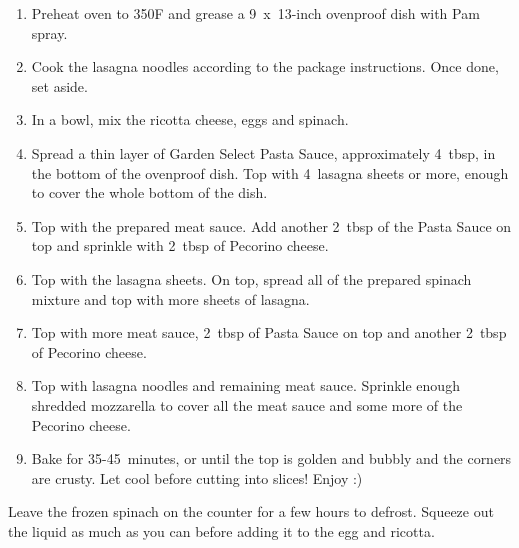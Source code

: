 \begin{enumerate}
    \item Preheat oven to 350\degree F and grease a 9~x~13-inch ovenproof dish with Pam spray.
    \item Cook the lasagna noodles according to the package instructions. Once done, set aside.
    \item In a bowl, mix the ricotta cheese, eggs and spinach.
    \item Spread a thin layer of Garden Select Pasta Sauce, approximately 4~tbsp, in the bottom of the ovenproof dish. Top with 4~lasagna sheets or more, enough to cover the whole bottom of the dish.
    \item Top with the prepared meat sauce. Add another 2~tbsp of the Pasta Sauce on top and sprinkle with 2~tbsp of Pecorino cheese.
    \item Top with the lasagna sheets. On top, spread all of the prepared spinach mixture and top with more sheets of lasagna.
    \item Top with more meat sauce, 2~tbsp of Pasta Sauce on top and another 2~tbsp of Pecorino cheese.
    \item Top with lasagna noodles and remaining meat sauce. Sprinkle enough shredded mozzarella to cover all the meat sauce and some more of the Pecorino cheese.
    \item Bake for 35-45~minutes, or until the top is golden and bubbly and the corners are crusty. Let cool before cutting into slices! Enjoy :)
\end{enumerate}

Leave the frozen spinach on the counter for a few hours to defrost. Squeeze out the liquid as much as you can before adding it to the egg and ricotta.
